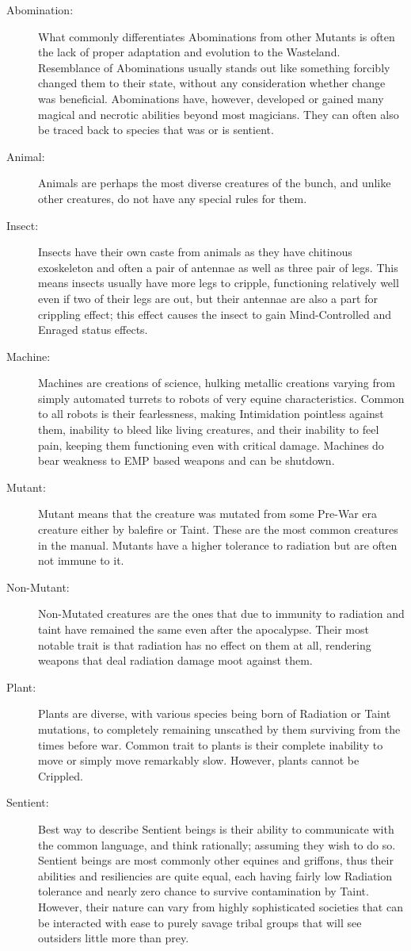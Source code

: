 \documentclass[11pt,a4paper,twocolumn]{book}
\begin{document}
	\begin{description}		
		\item[Abomination:]  What commonly differentiates Abominations from other Mutants is often the lack of proper adaptation and evolution to the Wasteland. Resemblance of Abominations usually stands out like something forcibly changed them to their state, without any consideration whether change was beneficial. Abominations have, however, developed or gained many magical and necrotic abilities beyond most magicians. They can often also be traced back to species that was or is sentient.
		\item[Animal:] Animals are perhaps the most diverse creatures of the bunch, and unlike other creatures, do not have any special rules for them.
		\item[Insect:] Insects have their own caste from animals as they have chitinous exoskeleton and often a pair of antennae as well as three pair of legs. This means insects usually have more legs to cripple, functioning relatively well even if two of their legs are out, but their antennae are also a part for crippling effect; this effect causes the insect to gain Mind-Controlled and Enraged status effects.
		\item[Machine:] Machines are creations of science, hulking metallic creations varying from simply automated turrets to robots of very equine characteristics. Common to all robots is their fearlessness, making Intimidation pointless against them, inability to bleed like living creatures, and their inability to feel pain, keeping them functioning even with critical damage. Machines do bear weakness to EMP based weapons and can be shutdown.
		\item[Mutant:] Mutant means that the creature was mutated from some Pre-War era creature either by balefire or Taint. These are the most common creatures in the manual. Mutants have a higher tolerance to radiation but are often not immune to it.
		\item[Non-Mutant:] Non-Mutated creatures are the ones that due to immunity to radiation and taint have remained the same even after the apocalypse. Their most notable trait is that radiation has no effect on them at all, rendering weapons that deal radiation damage moot against them.
		\item[Plant:] Plants are diverse, with various species being born of Radiation or Taint mutations, to completely remaining unscathed by them surviving from the times before war. Common trait to plants is their complete inability to move or simply move remarkably slow. However, plants cannot be Crippled.
		\item[Sentient:] Best way to describe Sentient beings is their ability to communicate with the common language, and think rationally; assuming they wish to do so. Sentient beings are most commonly other equines and griffons, thus their abilities and resiliencies are quite equal, each having fairly low Radiation tolerance and nearly zero chance to survive contamination by Taint. However, their nature can vary from highly sophisticated societies that can be interacted with ease to purely savage tribal groups that will see outsiders little more than prey.
		
	\end{description}	
\end{document}
